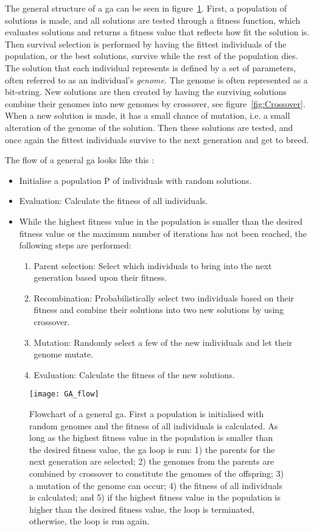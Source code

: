 The general structure of a \ac{ga} can be seen in figure~\ref{fig:GA}. First, a population of solutions is made, and all solutions are tested through a fitness function, which evaluates solutions and returns a fitness value that reflects how fit the solution is. Then survival selection is performed by having the fittest individuals of the population, or the best solutions, survive while the rest of the population dies. The solution that each individual represents is defined by a set of parameters, often referred to as an individual’s \textit{genome}. The genome is often represented as a bit-string. New solutions are then created by having the surviving solutions combine their genomes into new genomes by crossover, see figure~\ref{fig:Crossover}. When a new solution is made, it has a small chance of mutation, i.e. a small alteration of the genome of the solution. Then these solutions are tested, and once again the fittest individuals survive to the next generation and get to breed.

The flow of a general \ac{ga} looks like this \citep{michalski2013machine}:
\begin{itemize}
    \item Initialise a population P of individuals with random solutions.
    \item Evaluation: Calculate the fitness of all individuals.
    \item While the highest fitness value in the population is smaller than the desired fitness value or the maximum number of iterations has not been reached, the following steps are performed:
    \begin{enumerate}
        \item Parent selection: Select which individuals to bring into the next generation based upon their fitness.
        \item Recombination: Probabilistically select two individuals based on their fitness and combine their solutions into two new solutions by using crossover.
        \item Mutation: Randomly select a few of the new individuals and let their genome mutate.
        \item Evaluation: Calculate the fitness of the new solutions.
    \end{enumerate}
\end{itemize}


\begin{figure}[htbp]
    \centering
    \texttt{[image: GA\_flow]}
    \caption[Flowchart of a general \ac{ga}.]{Flowchart of a general \ac{ga}. First a population is initialised with random genomes and the fitness of all individuals is calculated. As long as the highest fitness value in the population is smaller than the desired fitness value, the \ac{ga} loop is run: 1) the parents for the next generation are selected; 2) the genomes from the parents are combined by crossover to constitute the genomes of the offspring; 3) a mutation of the genome can occur; 4) the fitness of all individuals is calculated; and 5) if the highest fitness value in the population is higher than the desired fitness value, the loop is terminated, otherwise, the loop is run again.}
    \label{fig:GA}
\end{figure}


